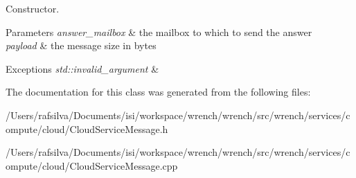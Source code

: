 Constructor. 


\begin{DoxyParams}{Parameters}
{\em answer\+\_\+mailbox} & the mailbox to which to send the answer \\
\hline
{\em payload} & the message size in bytes\\
\hline
\end{DoxyParams}

\begin{DoxyExceptions}{Exceptions}
{\em std\+::invalid\+\_\+argument} & \\
\hline
\end{DoxyExceptions}


The documentation for this class was generated from the following files\+:\begin{DoxyCompactItemize}
\item 
/\+Users/rafsilva/\+Documents/isi/workspace/wrench/wrench/src/wrench/services/compute/cloud/Cloud\+Service\+Message.\+h\item 
/\+Users/rafsilva/\+Documents/isi/workspace/wrench/wrench/src/wrench/services/compute/cloud/Cloud\+Service\+Message.\+cpp\end{DoxyCompactItemize}

